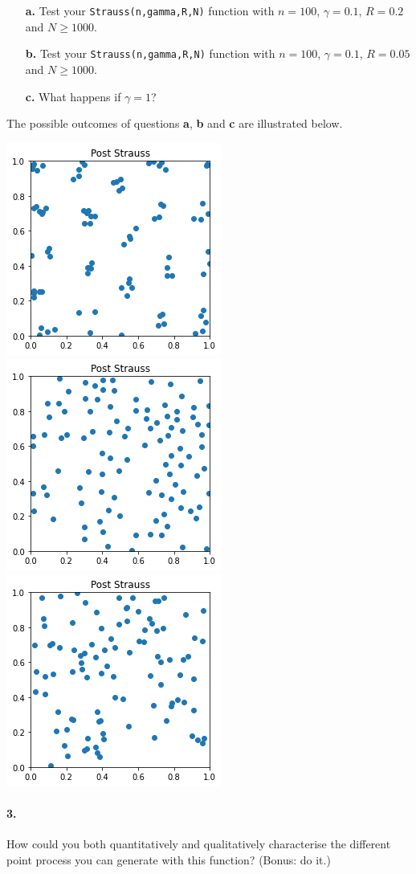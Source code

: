 \documentclass{article}
\begin{document}
\begin{enumerate}
\item[\textbf{a.}] Test your \texttt{Strauss(n,gamma,R,N)} function with $n=100$, $\gamma = 0.1$, $R=0.2$ and $N\geq 1000$.
\item[\textbf{b.}] Test your \texttt{Strauss(n,gamma,R,N)} function with $n=100$, $\gamma = 0.1$, $R=0.05$ and $N\geq 1000$.
\item[\textbf{c.}] What happens if $\gamma = 1$?
\end{enumerate}

The possible outcomes of questions \textbf{a}, \textbf{b} and \textbf{c} are illustrated below.

\begin{center}
\includegraphics[width=.3\textwidth]{agreg.png}
\quad
\includegraphics[width=.3\textwidth]{regulier2.png}
\quad
\includegraphics[width=.3\textwidth]{poisson.png}
\end{center}


\paragraph{3.} How could you both  quantitatively and qualitatively characterise the different point process you can generate with this function? (Bonus: do it.)\\
\end{document}
